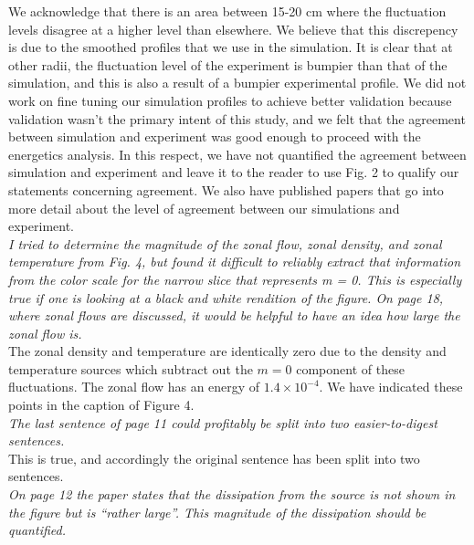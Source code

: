 \documentclass[12pt]{article}
\begin{document}
{\noindent We acknowledge that there is an area between 15-20 cm where the fluctuation levels disagree at a higher level than elsewhere. We believe that this discrepency is due to the smoothed
profiles that we use in the simulation. It is clear that at other radii, the fluctuation level of the experiment is bumpier than that of the simulation, and this is also a result
of a bumpier experimental profile. We did not work on fine tuning our simulation profiles to achieve better validation because validation wasn't the primary intent of this study,
and we felt that the agreement between simulation and experiment was good enough to proceed with the energetics analysis. In this respect, we have not quantified the agreement between 
simulation and experiment and leave it to the reader to use Fig. 2 to qualify our statements concerning agreement. We also have published papers that go into more detail about the level
of agreement between our simulations and experiment. }\\

{\noindent \itshape   I tried to determine the magnitude of the zonal flow, zonal density, and zonal
temperature from Fig. 4, but found it difficult to reliably extract that information from the
color scale for the narrow slice that represents m = 0. This is especially true if one is
looking at a black and white rendition of the figure. On page 18, where zonal flows are
discussed, it would be helpful to have an idea how large the zonal flow is. }\\

{\noindent The zonal density and temperature are identically zero due to the density and temperature sources which subtract out the $m=0$ component of these fluctuations. The zonal flow has an energy
of $1.4 \times 10^{-4}$. We have indicated these points in the caption of Figure 4. }\\

{\noindent \itshape   The last sentence of page 11 could profitably be split into two easier-to-digest sentences. }\\

{\noindent This is true, and accordingly the original sentence has been split into two sentences. }\\

{\noindent \itshape   On page 12 the paper states that the dissipation from the source is not shown in the
figure but is “rather large”. This magnitude of the dissipation should be quantified. }\\
\end{document}
